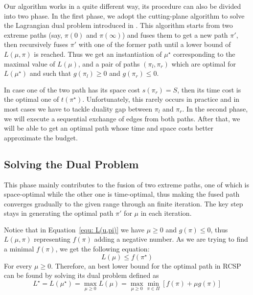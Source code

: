 \documentclass{sig-alternate-05-2015}
\begin{document}
Our algorithm works in a quite different way, its procedure can also be divided into two phase.
In the first phase, we adopt the cutting-plane algorithm to solve the Lagrangian dual problem introduced in \cite{handler1980dual}.
This algorithm starts from two extreme paths (say, $ \pi(0) $ and $ \pi(\infty) $) and fuses them to get a new path $ \pi' $, then recursively fuses $ \pi' $ with one of the former path until
a lower bound of $ L(\mu,\pi) $ is reached.
Thus we get an instantiation of $ \mu^\star $ corresponding to the maximal value of $ L(\mu) $, and a pair of paths $ (\pi_l,\pi_r) $ which are optimal for $ L(\mu^\star) $ and such that $ g(\pi_l) \geqslant 0 $ and $ g(\pi_r) \leqslant 0 $.

In case one of the two path has its space cost $ s(\pi_r) = S $, then its time cost is the optimal one of $ t(\pi^\star) $.
Unfortunately, this rarely occurs in practice and in most cases we have to tackle duality gap between $ \pi_l $ and $ \pi_r $.
In the second phase, we will execute a sequential exchange of edges from both paths.
After that, we will be able to get an optimal path whose time and space costs better approximate the budget.

\subsection{Solving the Dual Problem}
This phase mainly contributes to the fusion of two extreme paths, one of which is space-optimal while the other one is time-optimal, thus making the fused path converges gradually to the given range through an finite iteration.
The key step stays in generating the optimal path $ \pi' $ for $ \mu $ in each iteration.

Notice that in Equation~\eqref{equ: L(u,pi)} we have $ \mu \geqslant 0 $ and $ g(\pi) \leqslant 0 $, thus $ L(\mu,\pi) $ representing $ f(\pi) $ adding a negative number.
As we are trying to find a minimal $ f(\pi) $, we get the following equation:
\begin{equation}
L(\mu) \leqslant f(\pi^\star) \label{equ: maximum}
\end{equation}
\noindent For every $ \mu \geqslant 0 $.
Therefore, an best lower bound for the optimal path in RCSP can be found by solving its dual problem defined as 
\begin{equation}
L^\star = L(\mu^\star) = \max_{\mu \geqslant 0} L(\mu) =\max_{\mu \geqslant 0} \min_{\pi \in \Pi} \left[ f(\pi) + \mu g(\pi) \right]
\end{equation}
\end{document}
